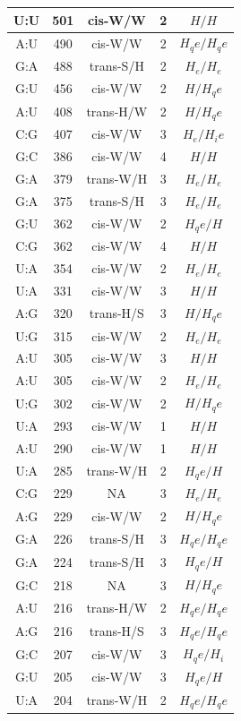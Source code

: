 \begin{center}
\begin{longtable}{c|c|c|c|c}
U:U & 501 & cis-W/W & 2 & $H/H$ \\  \hline
A:U & 490 & cis-W/W & 2 & $H_qe/H_qe$ \\  \hline
G:A & 488 & trans-S/H & 2 & $H_e/H_e$ \\  \hline
G:U & 456 & cis-W/W & 2 & $H/H_qe$ \\  \hline
A:U & 408 & trans-H/W & 2 & $H/H_qe$ \\  \hline
C:G & 407 & cis-W/W & 3 & $H_e/H_ie$ \\  \hline
G:C & 386 & cis-W/W & 4 & $H/H$ \\  \hline
G:A & 379 & trans-W/H & 3 & $H_e/H_e$ \\  \hline
G:A & 375 & trans-S/H & 3 & $H_e/H_e$ \\  \hline
G:U & 362 & cis-W/W & 2 & $H_qe/H$ \\  \hline
C:G & 362 & cis-W/W & 4 & $H/H$ \\  \hline
U:A & 354 & cis-W/W & 2 & $H_e/H_e$ \\  \hline
U:A & 331 & cis-W/W & 3 & $H/H$ \\  \hline
A:G & 320 & trans-H/S & 3 & $H/H_qe$ \\  \hline
U:G & 315 & cis-W/W & 2 & $H_e/H_e$ \\  \hline
A:U & 305 & cis-W/W & 3 & $H/H$ \\  \hline
A:U & 305 & cis-W/W & 2 & $H_e/H_e$ \\  \hline
U:G & 302 & cis-W/W & 2 & $H/H_qe$ \\  \hline
U:A & 293 & cis-W/W & 1 & $H/H$ \\  \hline
A:U & 290 & cis-W/W & 1 & $H/H$ \\  \hline
U:A & 285 & trans-W/H & 2 & $H_qe/H$ \\  \hline
C:G & 229 & NA & 3 & $H_e/H_e$ \\  \hline
A:G & 229 & cis-W/W & 2 & $H/H_qe$ \\  \hline
G:A & 226 & trans-S/H & 3 & $H_qe/H_qe$ \\  \hline
G:A & 224 & trans-S/H & 3 & $H_qe/H$ \\  \hline
G:C & 218 & NA & 3 & $H/H_qe$ \\  \hline
A:U & 216 & trans-H/W & 2 & $H_qe/H_qe$ \\  \hline
A:G & 216 & trans-H/S & 3 & $H_qe/H_qe$ \\  \hline
G:C & 207 & cis-W/W & 3 & $H_qe/H_i$ \\  \hline
G:U & 205 & cis-W/W & 3 & $H_qe/H$ \\  \hline
U:A & 204 & trans-W/H & 2 & $H_qe/H_qe$ \\  \hline

\end{longtable}
\end{center}
